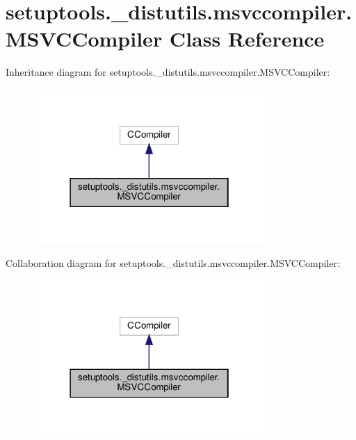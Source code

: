 \hypertarget{classsetuptools_1_1__distutils_1_1msvccompiler_1_1MSVCCompiler}{}\section{setuptools.\+\_\+distutils.\+msvccompiler.\+M\+S\+V\+C\+Compiler Class Reference}
\label{classsetuptools_1_1__distutils_1_1msvccompiler_1_1MSVCCompiler}


Inheritance diagram for setuptools.\+\_\+distutils.\+msvccompiler.\+M\+S\+V\+C\+Compiler\+:
\nopagebreak
\begin{figure}[H]
\begin{center}
\leavevmode
\includegraphics[width=250pt]{classsetuptools_1_1__distutils_1_1msvccompiler_1_1MSVCCompiler__inherit__graph}
\end{center}
\end{figure}


Collaboration diagram for setuptools.\+\_\+distutils.\+msvccompiler.\+M\+S\+V\+C\+Compiler\+:
\nopagebreak
\begin{figure}[H]
\begin{center}
\leavevmode
\includegraphics[width=250pt]{classsetuptools_1_1__distutils_1_1msvccompiler_1_1MSVCCompiler__coll__graph}
\end{center}
\end{figure}
